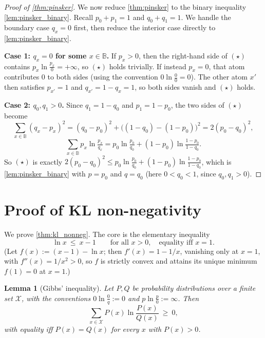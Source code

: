 \documentclass[fontsize=11pt, parskip=half]{scrartcl}
\newtheorem{lemma}[theorem]{Lemma}
\theoremstyle{definition}
\begin{document}
\begin{proof}[Proof of \cref{thm:pinsker}]
    We now reduce \cref{thm:pinsker} to the binary inequality \cref{lem:pinsker_binary}.
    Recall $p_0 + p_1 = 1$ and $q_0 + q_1 = 1$. We handle the boundary case
$q_x = 0$ first, then reduce the interior case directly to
\cref{lem:pinsker_binary}.

\medskip
\textbf{Case 1: $q_x = 0$ for some $x \in \mathbb{B}$.}
If $p_x > 0$, then the right-hand side of $(\star)$ contains
$p_x \ln \tfrac{p_x}{0} = +\infty$, so $(\star)$ holds trivially.
If instead $p_x = 0$, that atom contributes $0$ to both sides
(using the convention $0 \ln \tfrac{0}{0} = 0$). The other atom $x'$ then
satisfies $p_{x'} = 1$ and $q_{x'} = 1 - q_x = 1$, so both sides vanish and
$(\star)$ holds.

\medskip
\textbf{Case 2: $q_0, q_1 > 0$.}
Since $q_1 = 1 - q_0$ and $p_1 = 1 - p_0$, the two sides of $(\star)$ become
\[
    \sum_{x \in \mathbb{B}} (q_x - p_x)^2
    = (q_0 - p_0)^2 + \big((1-q_0) - (1-p_0)\big)^2
    = 2(p_0 - q_0)^2,
\]
\[
    \sum_{x \in \mathbb{B}} p_x \ln \tfrac{p_x}{q_x}
    = p_0 \ln \tfrac{p_0}{q_0} + (1 - p_0) \ln \tfrac{1 - p_0}{1 - q_0}.
\]
So $(\star)$ is exactly
$2(p_0 - q_0)^2 \leq p_0 \ln \tfrac{p_0}{q_0} + (1 - p_0) \ln \tfrac{1 - p_0}{1 - q_0}$,
which is \cref{lem:pinsker_binary} with $p = p_0$ and $q = q_0$
(here $0 < q_0 < 1$, since $q_0, q_1 > 0$).
\end{proof}

\section{Proof of KL non-negativity}\label{app:kl_nonneg}

We prove \cref{thm:kl_nonneg}. The core is the elementary inequality
\[
  \ln x ~\leq~ x - 1 \qquad \text{for all } x > 0, \quad \text{equality iff } x = 1.
\]
(Let $f(x) := (x - 1) - \ln x$; then $f'(x) = 1 - 1/x$, vanishing only at $x = 1$, with $f''(x) = 1/x^2 > 0$, so $f$ is strictly convex and attains its unique minimum $f(1) = 0$ at $x = 1$.)

\begin{lemma}[Gibbs' inequality]\label{lem:gibbs}
Let $P, Q$ be probability distributions over a finite set $\mathcal{X}$, with the conventions $0 \ln \tfrac{0}{q} := 0$ and $p \ln \tfrac{p}{0} := \infty$. Then
\[
  \sum_{x \in \mathcal{X}} P(x) \ln \frac{P(x)}{Q(x)} ~\geq~ 0,
\]
with equality iff $P(x) = Q(x)$ for every $x$ with $P(x) > 0$.
\end{lemma}
\end{document}
